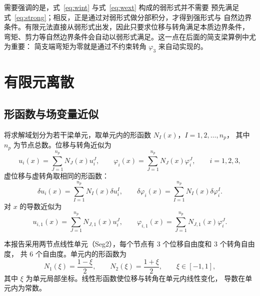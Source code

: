\documentclass[UTF8,a4paper,11pt]{ctexart}
\begin{document}
需要强调的是，式~\eqref{eq:wint} 与式~\eqref{eq:wext} 构成的弱形式并不需要
预先满足式~\eqref{eq:strong}；相反，正是通过对弱形式做分部积分，才得到强形式与
自然边界条件。有限元法直接从弱形式出发，因此只要求位移与转角满足本质边界条件，
弯矩、剪力等自然边界条件会自动以弱形式满足。这一点在后面的简支梁算例中尤为重要：
简支端弯矩为零就是通过不约束转角 $\varphi_3$ 来自动实现的。

\section{有限元离散}

\subsection{形函数与场变量近似}

将求解域划分为若干梁单元，取单元内的形函数 $N_I(x)$，$I=1,2,\ldots,n_p$，
其中 $n_p$ 为节点总数。位移与转角近似为
\begin{equation}\label{eq:approx}
u_i(x)=\sum_{J=1}^{n_p}N_J(x)u_i^J,\qquad
\varphi_i(x)=\sum_{J=1}^{n_p}N_J(x)\varphi_i^J,\qquad i=1,2,3,
\end{equation}
虚位移与虚转角取相同的形函数：
\begin{equation}
\delta u_i(x)=\sum_{I=1}^{n_p}N_I(x)\delta u_i^I,\qquad
\delta\varphi_i(x)=\sum_{I=1}^{n_p}N_I(x)\delta\varphi_i^I.
\end{equation}
对 $x$ 的导数近似为
\begin{equation}\label{eq:deriv}
u_{i,1}(x)=\sum_{J=1}^{n_p}N_{J,1}(x)u_i^J,\qquad
\varphi_{i,1}(x)=\sum_{J=1}^{n_p}N_{J,1}(x)\varphi_i^J.
\end{equation}

本报告采用两节点线性单元（Seg2），每个节点有 3 个位移自由度和 3 个转角自由度，
共 6 个自由度。单元内的形函数为
\begin{equation}\label{eq:shape}
N_1(\xi)=\frac{1-\xi}{2},\qquad N_2(\xi)=\frac{1+\xi}{2},
\qquad \xi\in[-1,1],
\end{equation}
其中 $\xi$ 为单元局部坐标。线性形函数使位移与转角在单元内线性变化，
导数在单元内为常数。
\end{document}
